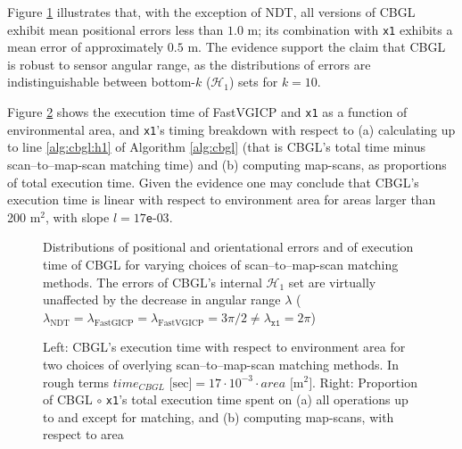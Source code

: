 Figure \ref{fig:c:errors_and_time} illustrates that, with the exception of
NDT, all versions of CBGL exhibit mean positional errors less than $1.0$ m; its
combination with \texttt{x1} exhibits a mean error of approximately $0.5$ m.
The evidence support the claim that CBGL is robust to sensor angular range,
as the distributions of errors are indistinguishable between bottom-$k$
($\mathcal{H}_1$) sets for $k=10$.

Figure \ref{fig:c:time_analysis} shows the execution time of FastVGICP and
\texttt{x1} as a function of environmental area, and \texttt{x1}'s timing
breakdown with respect to (a) calculating up to line \ref{alg:cbgl:h1} of
Algorithm \ref{alg:cbgl} (that is CBGL's total time minus scan--to--map-scan
matching time) and (b) computing map-scans, as proportions of total execution
time. Given the evidence one may conclude that CBGL's execution time is linear
with respect to environment area for areas larger than 200 m$^2$, with slope
$l = 17$\texttt{e}-$03$.

\begin{figure}
  
  \vspace{0.1cm}
  \caption{\small Distributions of positional and orientational errors and of
           execution time of CBGL for varying choices of scan--to--map-scan
           matching methods. The errors of CBGL's internal $\mathcal{H}_1$ set
           are virtually unaffected by the decrease in angular range $\lambda$
           ($\lambda_{\text{NDT}} = \lambda_{\text{FastGICP}} =
           \lambda_{\text{FastVGICP}} = 3\pi/2 \neq \lambda_{\texttt{x1}} = 2\pi$)
           }
  \label{fig:c:errors_and_time}
\end{figure}

\begin{figure}
  \vspace{0.5cm}
  
  \vspace{0.6cm}
  \caption{\small Left: CBGL's execution time with respect to environment area
           for two choices of overlying scan--to--map-scan matching
           methods. In rough terms $time_{CBGL} \text{ [sec]} =
           17\cdot10^{-3}\cdot area \text{ [} \text{m}^2 \text{]}$.  Right:
           Proportion of CBGL $\circ$ \texttt{x1}'s total execution time spent
           on (a) all operations up to and except for matching, and (b)
           computing map-scans, with respect to area}
  \vspace{-0.5cm}
  \label{fig:c:time_analysis}
\end{figure}
